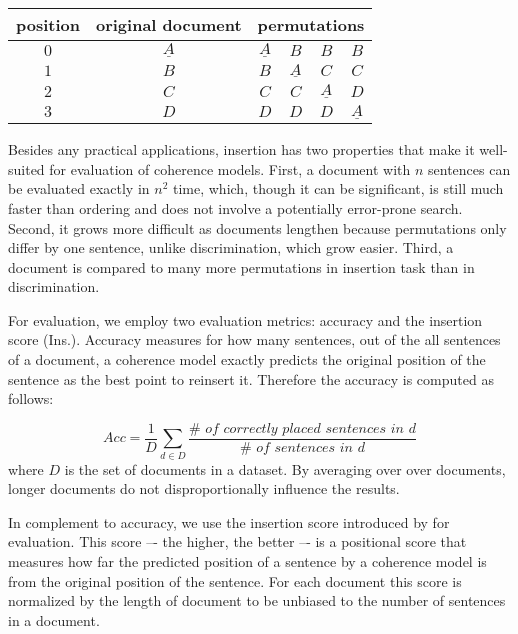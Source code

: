 \begin{table}[!ht]
\centering
\begin{small}
\begin{tabular}{cc|cccc}
position & original document  & \multicolumn{4}{c}{permutations}\\
\hline
$0$ & $\underline{A}$ & $\underline{A}$ & $B$ & $B$ & $B$\\
$1$ & $B$ 			  & $B$  & $\underline{A}$ & $C$ & $C$\\
$2$ & $C$			  & $C$ & $C$ & $\underline{A}$ & $D$\\
$3$ & $D$			  & $D$ & $D$ & $D$ & $\underline{A}$\\
\end{tabular}
\end{small}
\caption{}
\label{table:insertion_task}  
\end{table}

Besides any practical applications, insertion has two properties that make it well-suited for evaluation of coherence models. 
First, a document with $n$ sentences can be evaluated exactly in $n^2$ time, which, though it can be significant, is
still much faster than ordering and does not involve a potentially error-prone search.
Second, it grows more difficult as documents lengthen because permutations only differ by one sentence, unlike discrimination, which grow easier. 
Third, a document is compared to many more permutations in insertion task than in discrimination. 


For evaluation, we employ two evaluation metrics: accuracy and the insertion score (Ins.). 
Accuracy measures for how many sentences, out of the all sentences of a document, a coherence model exactly predicts the original position of the sentence as the best point to reinsert it. 
Therefore the accuracy is computed as follows:

\begin{equation}
Acc = \frac{1}{D}\sum_{d \in D}\frac{\#\textit{ of correctly placed sentences in d}}{\#\textit{ of sentences in d}}
\end{equation}
%
where $D$ is the set of documents in a dataset.  
By averaging over over documents, longer documents do not disproportionally influence the results. 

In complement to accuracy, we use the insertion score introduced by 
 for evaluation. 
This score  –- the higher, the better –-  is a positional score that measures how far the predicted position of a sentence by a coherence model is from the original position of the sentence. 
For each document this score is normalized by the length of document to be unbiased to the number of sentences in a document. 

